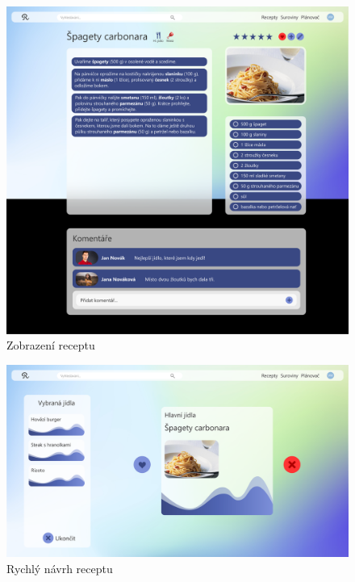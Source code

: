 \begin{figure}[H]
    \includegraphics[width=\textwidth]{pdf/adobexd/zobrazeni-receptu}
    \caption{Zobrazení receptu} \label{picture:recipeo:navrh:zobrazeni-receptu}
\end{figure}

\begin{figure}[H]
    \includegraphics[width=\textwidth]{pdf/adobexd/navrh-jidla}
    \caption{Rychlý návrh receptu} \label{picture:recipeo:navrh:rychly-navrh}
\end{figure}

